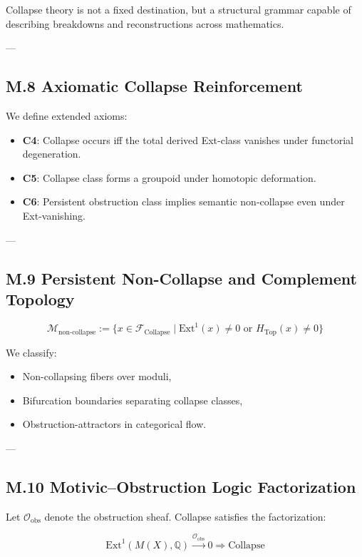 \documentclass[11pt]{article}
\begin{document}
\begin{axiom}
\begin{axiom}
{{Collapse theory is not a fixed destination, but a structural grammar  
capable of describing breakdowns and reconstructions across mathematics.

---

\subsection*{M.8 Axiomatic Collapse Reinforcement}

We define extended axioms:

\begin{itemize}
  \item \textbf{C4}: Collapse occurs iff the total derived Ext-class vanishes under functorial degeneration.
  \item \textbf{C5}: Collapse class forms a groupoid under homotopic deformation.
  \item \textbf{C6}: Persistent obstruction class implies semantic non-collapse even under Ext-vanishing.
\end{itemize}

---

\subsection*{M.9 Persistent Non-Collapse and Complement Topology}

\[
\mathcal{M}_{\text{non-collapse}} := \{ x \in \mathcal{F}_{\text{Collapse}} \mid \mathrm{Ext}^1(x) \neq 0 \text{ or } H_{\text{Top}}(x) \neq 0 \}
\]

We classify:

\begin{itemize}
  \item Non-collapsing fibers over moduli,
  \item Bifurcation boundaries separating collapse classes,
  \item Obstruction-attractors in categorical flow.
\end{itemize}

---

\subsection*{M.10 Motivic–Obstruction Logic Factorization}

Let $\mathcal{O}_{\text{obs}}$ denote the obstruction sheaf.  
Collapse satisfies the factorization:

\[
\mathrm{Ext}^1(M(X),\mathbb{Q}) \overset{\mathcal{O}_{\text{obs}}}{\longrightarrow} 0 \Rightarrow \text{Collapse}
\]

}}
\end{axiom}
\end{axiom}
\end{document}

